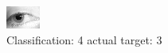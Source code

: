 \begin{figure}[h!]
\begin{center}
\includegraphics[width=0.60\columnwidth]{figures/ID1392_class_4_target_3.png}
\end{center}
\caption{ Classification: 4 actual target: 3}
\label{fig:ID1392_class_4_target_3}
\end{figure}
